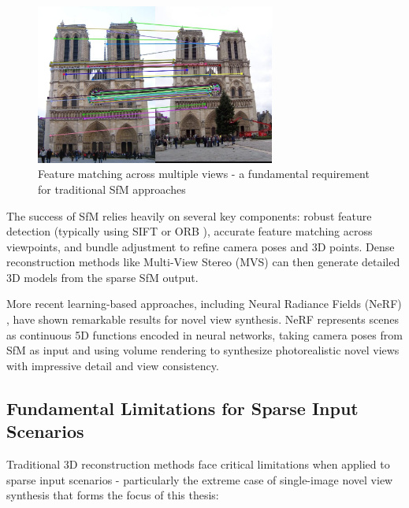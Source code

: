 \begin{figure}[h]
  \centering
  \includegraphics[width=0.7\textwidth]{images/related-work/feature-matching.jpg}
  \caption{Feature matching across multiple views - a fundamental requirement for traditional SfM approaches}
  \label{fig:matching-features}
\end{figure}

The success of SfM relies heavily on several key components: robust feature detection (typically using SIFT \cite{sift} or ORB \cite{orb}), accurate feature matching across viewpoints, and bundle adjustment to refine camera poses and 3D points. Dense reconstruction methods like Multi-View Stereo (MVS) can then generate detailed 3D models from the sparse SfM output.

More recent learning-based approaches, including Neural Radiance Fields (NeRF) \cite{nerf}, have shown remarkable results for novel view synthesis. NeRF represents scenes as continuous 5D functions encoded in neural networks, taking camera poses from SfM as input and using volume rendering to synthesize photorealistic novel views with impressive detail and view consistency.

\subsection{Fundamental Limitations for Sparse Input Scenarios}

Traditional 3D reconstruction methods face critical limitations when applied to sparse input scenarios - particularly the extreme case of single-image novel view synthesis that forms the focus of this thesis:

